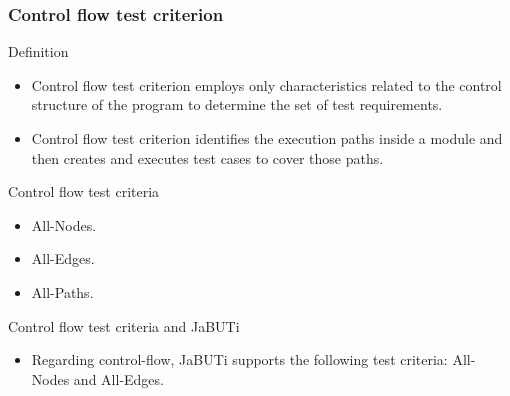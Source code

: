\begin{frame}[parent={cmap:structural-software-testing},hasnext=true,hasprev=true]
\frametitle{Control flow test criterion}
\label{concept:control-flow-test-criterion}

\begin{block:concept}{Definition}
\begin{itemize}
	\item Control flow test criterion employs only characteristics related
	to the control structure of the program to determine the set of test
	requirements.

	\item Control flow test criterion identifies the execution paths
	inside a module and then creates and executes test cases to cover those
	paths.
\end{itemize}
\end{block:concept}

\begin{block:fact}{Control flow test criteria}
\begin{itemize}
	\item All-Nodes.
	\item All-Edges.
	\item All-Paths.
\end{itemize}
\end{block:fact}


\begin{block:fact}{Control flow test criteria and JaBUTi}
\begin{itemize}
	\item Regarding control-flow, JaBUTi supports the following test criteria:
	All-Nodes and All-Edges.
\end{itemize}
\end{block:fact}
\end{frame}


